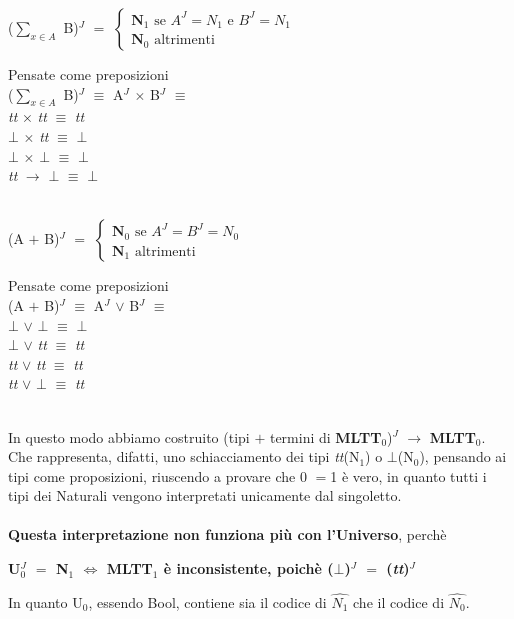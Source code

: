 \begin{enumerate}
\begin{center}
($\sum\limits_{x \in A}$ B)$^J$ $=$
$
\begin{cases}
\textbf{N}_1\text{ se } A^J =  N_1  \text{ e } B^J = N_1\\
\textbf{N}_0 \text{ altrimenti}
\end{cases}
$
\end{center}
\noindent
Pensate come preposizioni \\
($\sum\limits_{x \in A}$ B)$^J$ $\equiv$ A$^J$ $\times$ B$^J$ $\equiv$\\
\textit{tt} $\times$ \textit{tt} $\equiv$ \textit{tt}\\
$\bot$ $\times$ \textit{tt} $\equiv$ $\bot$  \\
$\bot$ $\times$ $\bot$ $\equiv$ $\bot$ \\
\textit{tt} $\rightarrow$ $\bot$ $\equiv$ $\bot$\\\\

\begin{center}
(A $+$ B)$^J$ $=$
$
\begin{cases}
\textbf{N}_0\text{ se } A^J = B^J = N_0\\
\textbf{N}_1 \text{ altrimenti}
\end{cases}
$
\end{center}
\noindent
Pensate come preposizioni \\
(A $+$ B)$^J$ $\equiv$ A$^J$ $\vee$ B$^J$ $\equiv$\\
$\bot$  $\vee$ $\bot$  $\equiv$ $\bot$ \\
$\bot$ $\vee$ \textit{tt} $\equiv$ \textit{tt}  \\
\textit{tt} $\vee$ \textit{tt} $\equiv$ \textit{tt} \\
\textit{tt} $\vee$ $\bot$ $\equiv$ \textit{tt}\\\\

\end{enumerate}
\noindent
In questo modo abbiamo costruito (tipi $+$ termini di \textbf{MLTT$_0$})$^J$ $\rightarrow$ \textbf{MLTT$_0$}. Che rappresenta, difatti, uno schiacciamento dei tipi \textit{tt}(N$_1$) o $\bot$(N$_0$), pensando ai tipi come proposizioni, riuscendo a provare che 0 $=$1 \`e vero, in quanto tutti i tipi dei Naturali vengono interpretati unicamente dal singoletto.\\\\
\noindent
\textbf{Questa interpretazione non funziona pi\`u con l'Universo}, perch\`e
\begin{center}\textbf{U$_0^J$  $=$ N$_1$ $\Leftrightarrow$ MLTT$_1$ \`e inconsistente, poich\`e ($\bot$)$^J$ $=$ (\textit{tt})$^J$} \end{center}
In quanto U$_0$, essendo Bool, contiene sia il codice di $\hat{N_1}$ che il codice di $\hat{N_0}$.

